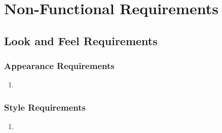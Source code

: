 \documentclass[]{article}
\begin{document}

\section{Non-Functional Requirements}
\label{sec:non-functional_requirements}



\subsection{Look and Feel Requirements}
\label{sub:look_and_feel_requirements}

\subsubsection{Appearance Requirements}
\label{ssub:appearance_requirements}
\begin{enumerate}[{LF-A}1. ]
	\item 
\end{enumerate}

\subsubsection{Style Requirements}
\label{ssub:style_requirements}
\begin{enumerate}[{LF-S}1. ]
	\item 
\end{enumerate}
\end{document}
